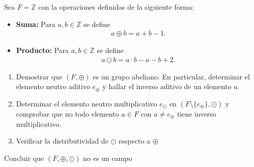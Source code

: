 \documentclass[11pt,letterpaper]{article}
\newcommand{\Z}{\mathbb{Z}}
\begin{document}
\begin{tcolorbox}[
title=Problema 4, 
width=\linewidth, 
coltitle=B, 
colback=B,
colframe=G, 
fonttitle=\bfseries,
]
Sea $F=\Z$ con la operaciones definidas de la siguiente forma:\\
	\begin{itemize}
		\item \textbf{Suma:} Para $a,b\in\Z$ se define
		\begin{align*}
			a\oplus b=a+b-1.
		\end{align*}
		\item \textbf{Producto:} Para $a,b\in\Z$ se define
		\begin{align*}
			a\odot b=a\cdot b-a-b+2.
		\end{align*}
	\end{itemize}

	\begin{enumerate}
		\item Demostrar que $(F,\oplus)$ es un grupo abeliano. En particular, determinar el elemento
		neutro aditivo $e_\oplus$ y hallar el inverso aditivo de un elemento $a$.
		\item Determinar el elemento neutro multiplicativo $e_\odot$ en $(F\setminus\{e_\oplus\},\odot)$ 
		y comprobar que no todo elemento $a\in F$ con $a\neq e_\oplus$ tiene inverso multiplicativo.
		\item Verificar la distributividad de $\odot$ respecto a $\oplus$
	\end{enumerate}
	Concluir que $(F,\oplus, \odot)$ no es un campo 
\end{tcolorbox}\,\\
\end{document}

